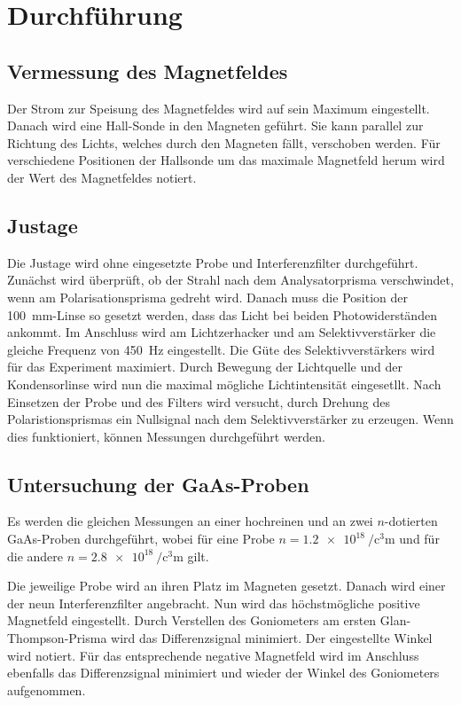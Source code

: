 \section{Durchführung}
\label{sec:Durchführung}



        \subsection{Vermessung des Magnetfeldes}

            Der Strom zur Speisung des Magnetfeldes wird auf sein Maximum eingestellt.
            Danach wird eine Hall-Sonde in den Magneten geführt. Sie kann parallel 
            zur Richtung des Lichts, welches durch den Magneten fällt, verschoben werden.
            Für verschiedene Positionen der Hallsonde um das maximale Magnetfeld herum wird 
            der Wert des Magnetfeldes notiert.

        \subsection{Justage}

            Die Justage wird ohne eingesetzte Probe und Interferenzfilter
            durchgeführt. Zunächst wird überprüft, ob der Strahl nach dem
            Analysatorprisma verschwindet, wenn am Polarisationsprisma gedreht wird.
            Danach muss die Position der \SI{100}{\milli\meter}-Linse so gesetzt werden,
            dass das Licht bei beiden Photowiderständen ankommt.
            Im Anschluss wird am Lichtzerhacker und am Selektivverstärker
            die gleiche Frequenz von \SI{450}{\hertz} eingestellt. Die Güte des 
            Selektivverstärkers wird für das Experiment maximiert.
            Durch Bewegung der Lichtquelle und der Kondensorlinse wird nun die 
            maximal mögliche Lichtintensität eingesetllt. Nach Einsetzen der 
            Probe und des Filters wird versucht, durch Drehung des Polaristionsprismas 
            ein Nullsignal nach dem Selektivverstärker zu erzeugen. Wenn dies funktioniert,
            können Messungen durchgeführt werden.

        \subsection{Untersuchung der GaAs-Proben}

            Es werden die gleichen Messungen an einer hochreinen und an zwei $n$-dotierten 
            GaAs-Proben durchgeführt, wobei für eine Probe 
            $n=\SI{1.2e18}{\per\cubic\centi\meter}$ 
            und für die andere $n=\SI{2.8e18}{\per\cubic\centi\meter}$ gilt.

            Die jeweilige Probe wird an ihren Platz im Magneten gesetzt. Danach wird einer 
            der neun Interferenzfilter angebracht. Nun wird das höchstmögliche positive Magnetfeld 
            eingestellt. Durch Verstellen des Goniometers am ersten Glan-Thompson-Prisma wird das 
            Differenzsignal minimiert. Der eingestellte Winkel wird notiert. Für das entsprechende
            negative Magnetfeld wird im Anschluss ebenfalls das Differenzsignal minimiert und 
            wieder der Winkel des Goniometers aufgenommen.
